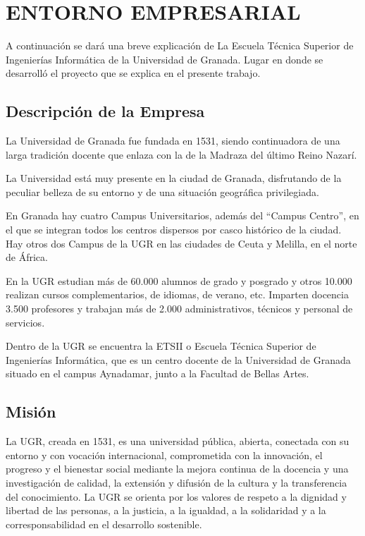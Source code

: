 \chapter{ENTORNO EMPRESARIAL}
\label{capituloEmpresa}

A continuación se dará una breve explicación de La Escuela Técnica Superior de Ingenierías Informática de la Universidad de Granada. Lugar en donde se desarrolló el proyecto que se explica en el presente trabajo.

\section{Descripción de la Empresa}
La Universidad de Granada fue fundada en 1531, siendo continuadora de una larga tradición docente que enlaza con la de la Madraza del último Reino Nazarí.

La Universidad está muy presente en la ciudad de Granada, disfrutando de la peculiar belleza de su entorno y de una situación geográfica privilegiada. 

En Granada hay cuatro Campus Universitarios, además del ``Campus Centro'', en el que se integran todos los centros dispersos por casco histórico de la ciudad. Hay otros dos Campus de la UGR en las ciudades de Ceuta y Melilla, en el norte de África.

En la UGR estudian más de 60.000 alumnos de grado y posgrado y otros 10.000 realizan cursos complementarios, de idiomas, de verano, etc. Imparten docencia 3.500 profesores y trabajan más de 2.000 administrativos, técnicos y personal de servicios.\cite{ugr}

Dentro de la UGR se encuentra la ETSII o Escuela Técnica Superior de Ingenierías Informática, que es un centro docente de la Universidad de Granada situado en el campus Aynadamar, junto a la Facultad de Bellas Artes.\cite{etsii}

\section{Misión}
La UGR, creada en 1531, es una universidad
pública, abierta, conectada con su
entorno y con vocación internacional,
comprometida con la innovación, el progreso
y el bienestar social mediante la
mejora continua de la docencia y una
investigación de calidad, la extensión y
difusión de la cultura y la transferencia
del conocimiento.
La UGR se orienta por los valores de
respeto a la dignidad y libertad de las
personas, a la justicia, a la igualdad, a la
solidaridad y a la corresponsabilidad en
el desarrollo sostenible.\cite{ugrMV}
